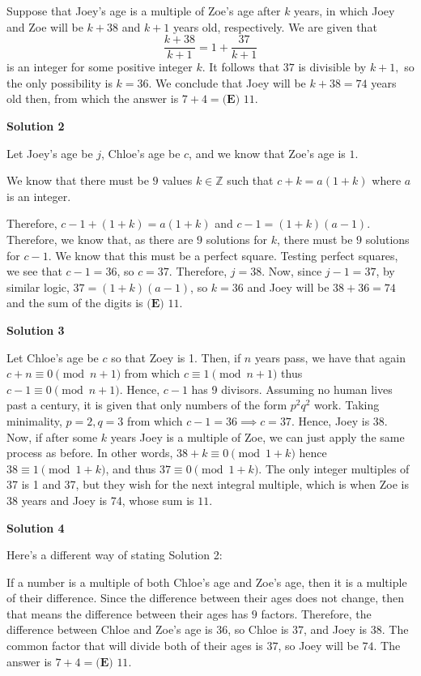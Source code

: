\begin{enumerate}
 Suppose that Joey's age is a multiple of Zoe's age after $k$ years, in which Joey and Zoe will be $k+38$ and $k+1$ years old, respectively. We are given that 
 \[\frac{k+38}{k+1}=1+\frac{37}{k+1}\] is an integer for some positive integer $k.$ It follows that $37$ is divisible by $k+1,$ so the only possibility is $k=36.$ We conclude that Joey will be $k+38=74$ years old then, from which the answer is $7+4=\boxed{\textbf{(E) }11}.$




\textbf{Solution 2}

Let Joey's age be $j$, Chloe's age be $c$, and we know that Zoe's age is $1$. 

 We know that there must be $9$ values $k\in\mathbb{Z}$ such that $c+k=a(1+k)$ where $a$ is an integer.

 Therefore, $c-1+(1+k)=a(1+k)$ and $c-1=(1+k)(a-1)$. Therefore, we know that, as there are $9$ solutions for $k$, there must be $9$ solutions for $c-1$. We know that this must be a perfect square. Testing perfect squares, we see that $c-1=36$, so $c=37$. Therefore, $j=38$. Now, since $j-1=37$, by similar logic, $37=(1+k)(a-1)$, so $k=36$ and Joey will be $38+36=74$ and the sum of the digits is $\boxed{\textbf{(E) }11}$.

 



\textbf{Solution 3}

Let Chloe's age be $c$ so that Zoey is 1. Then, if $n$ years pass, we have that again $c+n \equiv 0 \pmod{n+1}$ from which $c \equiv 1 \pmod{n+1}$ thus $c - 1 \equiv 0 \pmod{n+1}$. Hence, $c-1$ has 9 divisors. Assuming no human lives past a century, it is given that only numbers of the form $p^2q^2$ work. Taking minimality, $p = 2, q = 3$ from which $c-1 = 36 \implies c = 37$. Hence, Joey is 38. Now, if after some $k$ years Joey is a multiple of Zoe, we can just apply the same process as before. In other words, $38+k \equiv 0 \pmod{1+k}$ hence $38 \equiv 1 \pmod{1+k}$, and thus $37 \equiv 0 \pmod{1+k}$. The only integer multiples of 37 is 1 and 37, but they wish for the next integral multiple, which is when Zoe is 38 years and Joey is 74, whose sum is $\boxed{11}$.

 



\textbf{Solution 4}

Here's a different way of stating Solution 2:

 If a number is a multiple of both Chloe's age and Zoe's age, then it is a multiple of their difference. Since the difference between their ages does not change, then that means the difference between their ages has $9$ factors. Therefore, the difference between Chloe and Zoe's age is $36$, so Chloe is $37$, and Joey is $38$. The common factor that will divide both of their ages is $37$, so Joey will be $74$. The answer is $7 + 4 =  \boxed{\textbf{(E) }11}$.


\end{enumerate}
